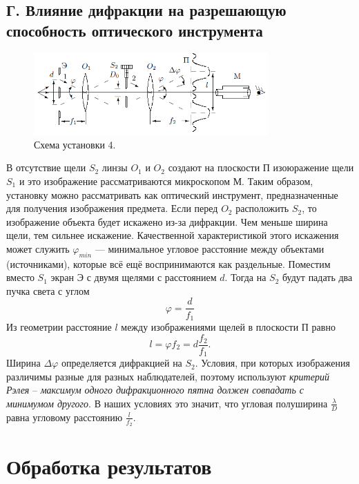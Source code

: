 \documentclass{article}
\begin{document}
\subsection*{Г. Влияние дифракции на разрешающую способность оптического инструмента}
\begin{figure}[h!]
	\includegraphics[width = 0.8\textwidth]{5.png}
	\centering
	\caption{Схема установки 4.}
\end{figure}
В отсутствие щели $S_2$ линзы $O_1$ и $O_2$ создают на плоскости П изоюражение щели $S_1$ и это изображение рассматриваются микроскопом М. Таким образом, установку можно рассматривать как оптический инструмент, предназначенные для получения изображения предмета. Если перед $O_2$ расположить $S_2$, то изображение объекта будет искажено из-за дифракции. Чем меньше ширина щели, тем сильнее искажение. Качественной характеристикой этого искажения может служить $\varphi_{min}$ --- минимальное угловое расстояние между объектами (источниками), которые всё ещё воспринимаются как раздельные. Поместим вместо $S_1$ экран Э с двумя щелями с расстоянием $d$. Тогда на $S_2$ будут падать два пучка света с углом
\begin{equation}
\varphi = \dfrac{d}{f_1}
\end{equation}
Из геометрии расстояние $l$ между изображениями щелей в плоскости П равно 
\begin{equation}
l = \varphi f_2 = d \dfrac{f_2}{f_1}.
\end{equation}
Ширина $\Delta \varphi$ определяется дифракцией на $S_2$. Условия, при которых изображения различимы разные для разных наблюдателей, поэтому используют \textit{критерий Рэлея} -- \textit{максимум одного дифракционного пятна должен совпадать с минимумом другого}. В наших условиях это значит, что угловая полуширина $\frac{\lambda}{D}$ равна угловому расстоянию $\frac{l}{f_2}$.
\section{Обработка результатов}
\end{document}
